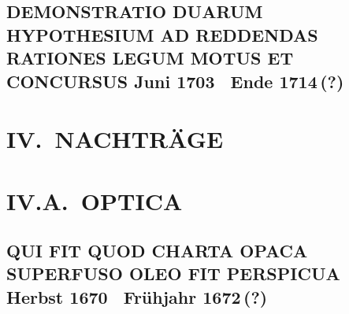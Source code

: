 \documentclass[%
fontsize=10pt,
]{scrbook}
\renewcommand*{\chapterheadstartvskip}{\vspace*{19.5ex}}	%
\renewcommand*{\chapterheadstartvskip}{\vspace*{0pt}}
\DeclareRobustCommand{\bracks}[1]{%
\textup{\lbrack}#1\textup{\rbrack}}
\begin{document}
\chapter[tocentry={Demonstratio duarum Hypothesium ad reddendas rationes legum motus et concursus
\enskip \bracks{Juni 1703 \textendash\ Ende 1714\,(?)}%
},
head={Demonstratio duarum Hypothesium}]%
{\MakeUppercase{Demonstratio duarum Hypothesium ad reddendas rationes legum motus et concursus}
\newline \bracks{Juni 1703 \textendash\ Ende 1714\,(?)}%
}

\label{60354}




















\part{IV.~NACHTRÄGE}






\part[tocentry={IV.A.~OPTICA (Zu Bd VIII, 1)},
head={IV.A.~OPTICA}]%
{IV.A.~OPTICA }	%
\renewcommand*{\chapterheadstartvskip}{\vspace*{0pt}}        %

\chapter[tocentry={Qui fit quod charta opaca superfuso oleo fit perspicua
\enskip\bracks{Herbst 1670 \textendash\ Frühjahr 1672\,(?)}},
head={Qui fit quod charta opaca superfuso oleo fit perspicua}]%
{\MakeUppercase{Qui fit quod charta opaca superfuso oleo fit perspicua}
\newline\bracks{Herbst 1670 \textendash\ Frühjahr 1672\,(?)}}
\label{41385}

\end{document}
